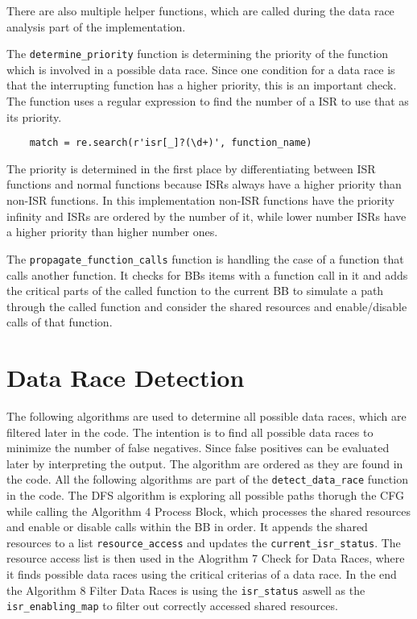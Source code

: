 \documentclass[
fancyheadings, %
%
%
]{stsreprt}
\begin{document}
{There are also multiple helper functions, which are called during the data race analysis part of the implementation. 

The \texttt{determine\_priority} function is determining the priority of the function which is involved in a possible data race. Since one condition for a data race is that the interrupting function has a higher priority, this is an important check. The function uses a regular expression to find the number of a \ac{ISR} to use that as its priority.
\begin{lstlisting}
	match = re.search(r'isr[_]?(\d+)', function_name)
\end{lstlisting}
The priority is determined in the first place by differentiating between \ac{ISR} functions and normal functions because \acp{ISR} always have a higher priority than non-\ac{ISR} functions. In this implementation non-\Ac{ISR} functions have the priority infinity and \acp{ISR} are ordered by the number of it, while lower number \acp{ISR} have a higher priority than higher number ones.
	
The \texttt{propagate\_function\_calls} function is handling the case of a function that calls another function. It checks for \acp{BB} items with a function call in it and adds the critical parts of the called function to the current \ac{BB} to simulate a path through the called function and consider the shared resources and enable/disable calls of that function.

\section{Data Race Detection}
The following algorithms are used to determine all possible data races, which are filtered later in the code. The intention is to find all possible data races to minimize the number of false negatives. Since false positives can be evaluated later by interpreting the output. The algorithm are ordered as they are found in the code. All the following algorithms are part of the \texttt{detect\_data\_race} function in the code. The \ac{DFS} algorithm is exploring all possible paths thorugh the \ac{CFG} while calling the Algorithm 4 Process Block, which processes the shared resources and enable or disable calls within the \ac{BB} in order. It appends the shared resources to a list \texttt{resource\_access} and updates the \texttt{current\_isr\_status}. The resource access list is then used in the Alogrithm 7 Check for Data Races, where it finds possible data races using the critical criterias of a data race. In the end the Algorithm 8 Filter Data Races is using the \texttt{isr\_status} aswell as the \texttt{isr\_enabling\_map} to filter out correctly accessed shared resources.

}
\end{document}
